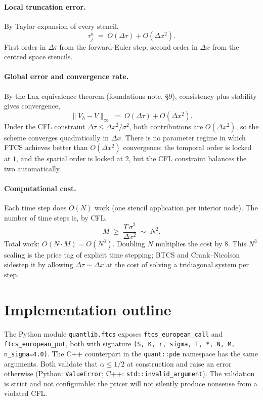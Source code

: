 \documentclass[11pt,a4paper]{article}
\begin{document}
\paragraph{Local truncation error.} By Taylor expansion of every
stencil,
\[
\tau_{j}^n \;=\; O(\Delta\tau) + O(\Delta x^2).
\]
First order in $\Delta\tau$ from the forward-Euler step; second order
in $\Delta x$ from the centred space stencils.

\paragraph{Global error and convergence rate.} By the Lax equivalence
theorem (foundations note, §9), consistency plus stability gives convergence,
\[
\bigl\|V_h - V\bigr\|_\infty \;=\; O(\Delta\tau) + O(\Delta x^2).
\]
Under the CFL constraint $\Delta\tau \le \Delta x^2 / \sigma^2$, both
contributions are $O(\Delta x^2)$, so the scheme converges
quadratically in $\Delta x$. There is no parameter regime in which
FTCS achieves better than $O(\Delta x^2)$ convergence: the temporal
order is locked at $1$, and the spatial order is locked at $2$, but
the CFL constraint balances the two automatically.

\paragraph{Computational cost.} Each time step does $O(N)$ work
(one stencil application per interior node). The number of time
steps is, by CFL,
\[
M \;\ge\; \frac{T\,\sigma^2}{\Delta x^2} \;\sim\; N^2.
\]
Total work: $O(N \cdot M) = O(N^3)$. Doubling $N$ multiplies the
cost by $8$. This $N^3$ scaling is the price tag of explicit time
stepping; BTCS and Crank--Nicolson sidestep it
by allowing $\Delta\tau \sim \Delta x$ at the cost of solving a
tridiagonal system per step.

\section{Implementation outline}

The Python module \texttt{quantlib.ftcs} exposes
\texttt{ftcs\_european\_call} and \texttt{ftcs\_european\_put}, both
with signature \texttt{(S, K, r, sigma, T, *, N, M, n\_sigma=4.0)}.
The C++ counterpart in the \texttt{quant::pde} namespace has the
same arguments. Both validate that $\alpha \le 1/2$ at construction
and raise an error otherwise (Python: \texttt{ValueError}; C++:
\texttt{std::invalid\_argument}). The validation is strict and not
configurable: the pricer will not silently produce nonsense from a
violated CFL.
\end{document}
